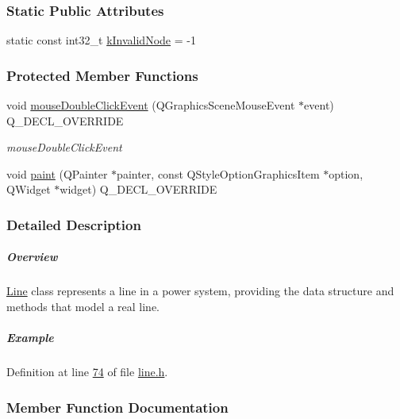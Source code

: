 \subsubsection*{Static Public Attributes}
\begin{DoxyCompactItemize}
\item 
static const int32\+\_\+t \hyperlink{group___models_gadc334bd07c6126abc56e531d7e3e72b4}{k\+Invalid\+Node} = -\/1
\end{DoxyCompactItemize}
\subsubsection*{Protected Member Functions}
\begin{DoxyCompactItemize}
\item 
void \hyperlink{group___models_ga9a1fee5b1606ab0deedd04bdab99be70}{mouse\+Double\+Click\+Event} (Q\+Graphics\+Scene\+Mouse\+Event $\ast$event) Q\+\_\+\+D\+E\+C\+L\+\_\+\+O\+V\+E\+R\+R\+I\+D\+E
\begin{DoxyCompactList}\small\item\em mouse\+Double\+Click\+Event \end{DoxyCompactList}\item 
void \hyperlink{group___models_ga0aa64aed379d434be5942edf572b444b}{paint} (Q\+Painter $\ast$painter, const Q\+Style\+Option\+Graphics\+Item $\ast$option, Q\+Widget $\ast$widget) Q\+\_\+\+D\+E\+C\+L\+\_\+\+O\+V\+E\+R\+R\+I\+D\+E
\end{DoxyCompactItemize}


\subsubsection{Detailed Description}
\subparagraph*{Overview}

\hyperlink{class_line}{Line} class represents a line in a power system, providing the data structure and methods that model a real line.

\subparagraph*{Example}


\begin{DoxyCode}
\end{DoxyCode}
 

Definition at line \hyperlink{line_8h_source_l00074}{74} of file \hyperlink{line_8h_source}{line.\+h}.



\subsubsection{Member Function Documentation}
\hypertarget{class_line_a2444b577ea2254994599c6f829c629a5}{}
